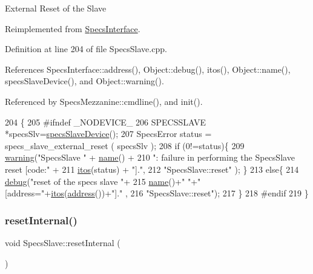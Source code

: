 External Reset of the Slave 

Reimplemented from \hyperlink{classSpecsInterface_ade474eeef32f10c72926c9ba7d23f9a8}{Specs\+Interface}.



Definition at line 204 of file Specs\+Slave.\+cpp.



References Specs\+Interface\+::address(), Object\+::debug(), itos(), Object\+::name(), specs\+Slave\+Device(), and Object\+::warning().



Referenced by Specs\+Mezzanine\+::cmdline(), and init().


\begin{DoxyCode}
204                       \{
205 \textcolor{preprocessor}{#ifndef \_NODEVICE\_
}
206   SPECSSLAVE *specsSlv=\hyperlink{classSpecsSlave_a44970aca61b6fdcd6d6d90e6601093f3}{specsSlaveDevice}();
207   SpecsError status = specs\_slave\_external\_reset ( specsSlv );
208   \textcolor{keywordflow}{if} (0!=status)\{
209     \hyperlink{classObject_a65cd4fda577711660821fd2cd5a3b4c9}{warning}(\textcolor{stringliteral}{"SpecsSlave "} + \hyperlink{classObject_a300f4c05dd468c7bb8b3c968868443c1}{name}() +
210             \textcolor{stringliteral}{": failure in performing the SpecsSlave reset [code:"} +
211             \hyperlink{Tools_8h_af330027dbdafb9a30768b3613c553e60}{itos}(status) + \textcolor{stringliteral}{"]."},
212             \textcolor{stringliteral}{"SpecsSlave::reset"} );   \}
213   \textcolor{keywordflow}{else}\{
214     \hyperlink{classObject_aac010553f022165573714b7014a15f0d}{debug}(\textcolor{stringliteral}{"reset of the specs slave "}+
215           \hyperlink{classObject_a300f4c05dd468c7bb8b3c968868443c1}{name}()+\textcolor{stringliteral}{" "}+\textcolor{stringliteral}{" [address="}+\hyperlink{Tools_8h_af330027dbdafb9a30768b3613c553e60}{itos}(\hyperlink{classSpecsInterface_a0fa039a15b842a5ba783ce825b9915d8}{address}())+\textcolor{stringliteral}{"]."} ,
216           \textcolor{stringliteral}{"SpecsSlave::reset"});
217   \}
218 \textcolor{preprocessor}{#endif
}
219 \}
\end{DoxyCode}
\mbox{\label{classSpecsSlave_aa4f2493eabe522bb6651abcd67a6a690}} 
\subsubsection{\texorpdfstring{reset\+Internal()}{resetInternal()}}
{\footnotesize\ttfamily void Specs\+Slave\+::reset\+Internal (\begin{DoxyParamCaption}{ }\end{DoxyParamCaption})}

